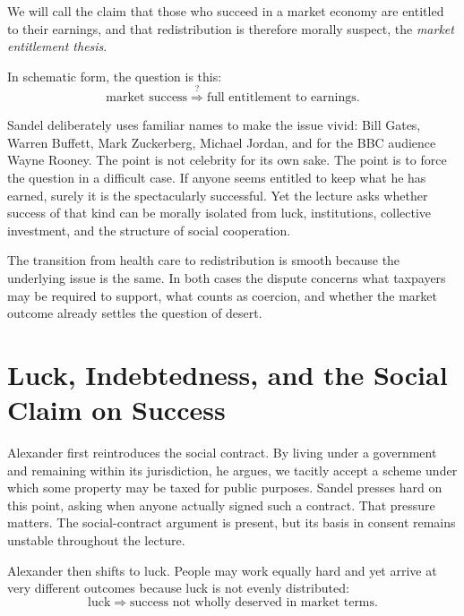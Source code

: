 \begin{definition}
We will call the claim that those who succeed in a market economy are entitled to their earnings, and that redistribution is therefore morally suspect, the \emph{market entitlement thesis}.
\end{definition}

In schematic form, the question is this:
\begin{equation}
\text{market success}
\stackrel{?}{\Longrightarrow}
\text{full entitlement to earnings}.
\end{equation}

Sandel deliberately uses familiar names to make the issue vivid: Bill Gates, Warren Buffett, Mark Zuckerberg, Michael Jordan, and for the BBC audience Wayne Rooney. The point is not celebrity for its own sake. The point is to force the question in a difficult case. If anyone seems entitled to keep what he has earned, surely it is the spectacularly successful. Yet the lecture asks whether success of that kind can be morally isolated from luck, institutions, collective investment, and the structure of social cooperation.

The transition from health care to redistribution is smooth because the underlying issue is the same. In both cases the dispute concerns what taxpayers may be required to support, what counts as coercion, and whether the market outcome already settles the question of desert.

\section{Luck, Indebtedness, and the Social Claim on Success}

Alexander first reintroduces the social contract. By living under a government and remaining within its jurisdiction, he argues, we tacitly accept a scheme under which some property may be taxed for public purposes. Sandel presses hard on this point, asking when anyone actually signed such a contract. That pressure matters. The social-contract argument is present, but its basis in consent remains unstable throughout the lecture.

Alexander then shifts to luck. People may work equally hard and yet arrive at very different outcomes because luck is not evenly distributed:
\begin{equation}
\text{luck}
\Longrightarrow
\text{success not wholly deserved in market terms}.
\end{equation}

